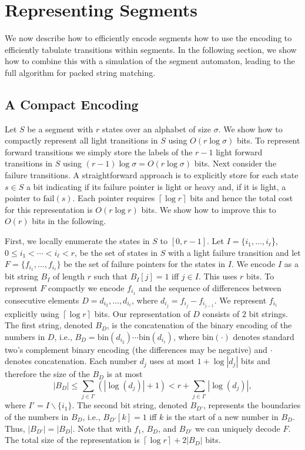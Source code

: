 \documentclass{article}
\newcommand{\bin}{\ensuremath{\mathrm{bin}}}
\newcommand{\fail}{\ensuremath{\mathrm{fail}}}
\newcommand{\ceil}[1]{\left\lceil{#1}\right\rceil}
\begin{document}
\section{Representing Segments}\label{sec:representation}
We now describe how to efficiently encode segments how to use the
encoding to efficiently tabulate transitions within segments. In the
following section, we show how to combine this with a simulation of
the segment automaton, leading to the full algorithm for packed
string matching. 



\subsection{A Compact Encoding}\label{sec:encoding}
Let $S$ be a segment with $r$ states over an alphabet of size
$\sigma$. We show how to compactly represent all light transitions in
$S$ using $O(r\log \sigma)$ bits. To represent forward transitions we
simply store the labels of the $r-1$ light forward transitions in $S$
using $(r-1)\log \sigma = O(r\log \sigma)$ bits. Next consider the
failure transitions. A straightforward approach is to explicitly store
for each state $s \in S$ a bit indicating if its failure pointer is
light or heavy and, if it is light, a pointer to $\fail(s)$. Each
pointer requires $\ceil{\log r}$ bits and hence the total cost for
this representation is $O(r \log r)$ bits. We show how to improve this
to $O(r)$ bits in the following.


First, we locally enumerate the states in $S$ to $[0, r-1]$. Let $I =
\{i_1, \ldots, i_\ell$\}, $0 \leq i_1 < \cdots < i_\ell < r$, be the
set of states in $S$ with a light failure transition and let $F =
\{f_{i_1}, \ldots, f_{i_\ell}\}$ be the set of failure pointers for
the states in $I$. We encode $I$ as a bit string $B_I$ of length $r$
such that $B_I[j] = 1$ iff $j \in I$. This uses $r$ bits. To represent
$F$ compactly we encode $f_{i_1}$ and the sequence of differences
between consecutive elements $D = d_{i_2}, \ldots, d_{i_{\ell}}$,
where $d_{i_j} = f_{i_j} - f_{i_{j-1}}$. We represent $f_{i_1}$
explicitly using $\ceil{\log r}$ bits. Our representation of $D$
consists of $2$ bit strings. The first string, denoted $B_D$, is the
concatenation of the binary encoding of the numbers in $D$, i.e., $B_D
= \bin(d_{i_2}) \cdots \bin(d_{i_\ell})$, where $\bin(\cdot)$ denotes
standard two's complement binary encoding (the differences may be
negative) and $\cdot$ denotes concatenation. Each number $d_j$ uses at
most $1 + \log |d_j|$ bits and therefore the size of the $B_D$ is at
most
\begin{equation}\label{eq:bd}
|B_D| \leq \sum_{j \in I'} (|\log(d_j)| + 1) < r + \sum_{j \in I'} |\log(d_j)|, 
\end{equation}
where $I' = I \backslash \{i_1\}$. The second bit string, denoted
$B_{D'}$, represents the boundaries of the numbers in $B_D$, i.e.,
$B_{D'}[k] = 1$ iff $k$ is the start of a new number in $B_D$. Thus,
$|B_{D'}| = |B_{D}|$. Note that with $f_1$, $B_D$, and $B_{D'}$ we can
uniquely decode $F$. The total size of the representation is
$\ceil{\log r} + 2|B_D|$ bits.
\end{document}
